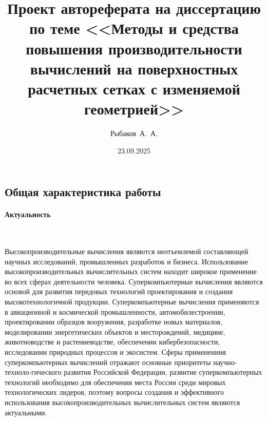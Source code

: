 \documentclass[a4paper,14pt]{extarticle}                     %
\theoremstyle{plain}                                         %
\begin{document}

\title{Проект автореферата на диссертацию по теме <<Методы и средства повышения производительности вычислений на поверхностных расчетных сетках с изменяемой геометрией>>}
\author{Рыбаков~А.~А.}
\date{23.09.2025}
\maketitle
\thispagestyle{empty}                                        %


\newpage
\subsection*{Общая характеристика работы}

\paragraph{Актуальность}

\

Высокопроизводительные вычисления являются неотъемлемой составляющей научных исследований, промышленных разработок и бизнеса.
Использование высокопроизводительных вычислительных систем находит широкое применение во всех сферах деятельности человека.
Суперкомпьютерные вычисления являются основой для развития передовых технологий проектирования и создания высокотехнологичной продукции.
Суперкомпьютерные вычисления применяются в авиационной и космической промышленности, автомобилестроении, проектировании образцов вооружения, разработке новых материалов, моделировании энергетических объектов и месторождений, медицине, животноводстве и растениеводстве, обеспечении кибербезопасности, исследовании природных процессов и экосистем.
Сферы применениия суперкомпьютерных вычислений отражают основные приоритеты научно-техноло-гического развития Российской Федерации, развитие суперкомпьютерных технологий необходимо для обеспечения места России среди мировых технологических лидеров, поэтому вопросы создания и эффективного использования высокопроизводительных вычислительных систем являются актуальными.
\end{document}
